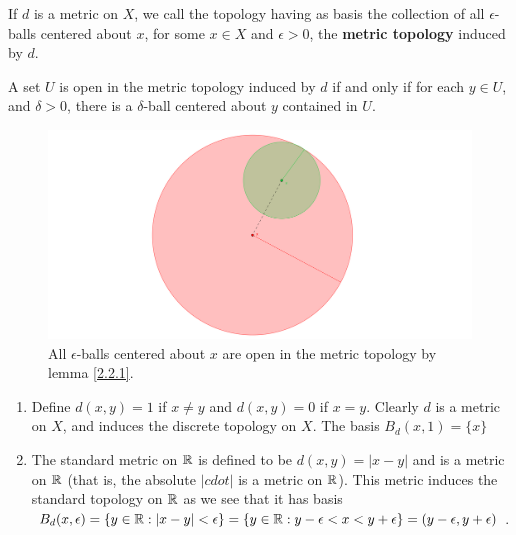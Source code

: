 \begin{definition}
    If $d$ is a metric on  $X$, we call the topology having as basis the collection of all
    $\epsilon$-balls centered about  $x$, for some  $x \in X$ and  $\epsilon>0$, the \textbf {metric
    topology} induced by $d$.		
\end{definition}

\begin{corollary}
    A set $U$ is open in the metric topology induced by  $d$ if and only if for each  $y \in U$, and
     $\delta>0$, there is a  $\delta$-ball centered about $y$ contained in  $U$.
\end{corollary}

\begin{figure}
    \centering
    \includegraphics[scale = 0.2]{Figures/Chapter2/openBall.png}
    \caption{All $\epsilon$-balls centered about  $x$ are open in the metric topology by lemma
    \ref{2.2.1}.}
    \label{fig2.1}
\end{figure}

\begin{example}
    \begin{enumerate}[label=(\arabic*)]
        \item Define $d(x,y)=1$ if $x \neq y$ and  $d(x,y)=0$ if $x=y$. Clearly  $d$ is a metric on
            $X$, and induces the discrete topology on  $X$. The basis  $B_d(x,1)=\{x\}$

        \item The standard metric on $\mathbb{R}$ is defined to be  $d(x,y)=|x-y|$ and is a metric on $\mathbb{R}$ 
            (that is, the absolute $|cdot|$ is a metric on  $\mathbb{R}$). This metric induces the standard
            topology on $\mathbb{R}$ as we see that it has basis $B_d(x,\epsilon)=\{y \in \mathbb{R}:
            |x-y|<\epsilon\}=\{y \in \mathbb{R}: y-\epsilon<x<y+\epsilon\}=(y-\epsilon,y+\epsilon)$.
    \end{enumerate}		
\end{example} 

